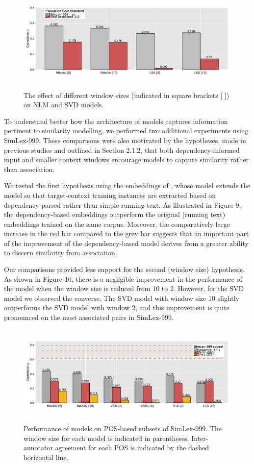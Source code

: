\documentclass[fullname]{clv2}
\begin{document}
\begin{figure}[]  \includegraphics[width = \textwidth,height=5cm]{Figure_3B_CL}  \caption{The effect of different window sizes (indicated in square brackets [ ]) on NLM and SVD models. }\end{figure}

To understand better how the architecture of models captures information pertinent to similarity modelling, we performed two additional experiments using SimLex-999. These comparisons were also motivated by the hypotheses, made in previous studies and outlined in Section 2.1.2, that both dependency-informed input and smaller context windows encourage models to capture similarity rather than association. 

We tested the first hypothesis using the embeddings of , whose model extends the  model so that target-context training instances are extracted based on dependency-parsed rather than simple running text. As illustrated in Figure 9, the dependency-based embeddings outperform the original (running text) embeddings trained on the same corpus. Moreover, the comparatively large increase in the red bar compared to the grey bar suggests that an important part of the improvement of the dependency-based model derives from a greater ability to discern similarity from association. 

Our comparisons provided less support for the second (window size) hypothesis. As shown in Figure 10, there is a negligible improvement in the performance of the \namecite{} model when the window size is reduced from 10 to 2. However, for the SVD model we observed the converse. The SVD model with window size 10 slightly outperforms the SVD model with window 2, and this improvement is quite pronounced on the most associated pairs in SimLex-999. 

\begin{figure}[]  \includegraphics[width = \textwidth,height=5cm]{Figure_5_CL}  \caption{Performance of models on POS-based subsets of SimLex-999. The window size for each model is indicated in parentheses. Inter-annotator agreement for each POS is indicated by the dashed horizontal line.}\end{figure}
\end{document}
